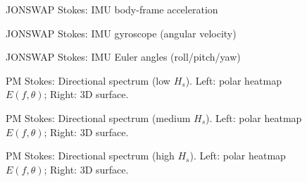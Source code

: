 \documentclass[11pt,letterpaper]{article}
\begin{document}
    \begin{figure}[H]\centering
    \resizebox{\textwidth}{!}{}
    \caption{JONSWAP Stokes: IMU body-frame acceleration}
    \label{fig:jonswap_imu_acc}
    \end{figure}

    \begin{figure}[H]\centering
    \resizebox{\textwidth}{!}{}
    \caption{JONSWAP Stokes: IMU gyroscope (angular velocity)}
    \label{fig:jonswap_imu_gyro}
    \end{figure}

    \begin{figure}[H]\centering
    \resizebox{\textwidth}{!}{}
    \caption{JONSWAP Stokes: IMU Euler angles (roll/pitch/yaw)}
    \label{fig:jonswap_euler}
    \end{figure}


    \begin{figure}[H]\centering
    \begin{minipage}{0.49\textwidth}
        \resizebox{\linewidth}{!}{}
    \end{minipage}\hfill
    \begin{minipage}{0.49\textwidth}
        \resizebox{\linewidth}{!}{}
    \end{minipage}
    \caption{PM Stokes: Directional spectrum (low $H_s$). Left: polar heatmap $E(f,\theta)$; Right: 3D surface.}
    \label{fig:pmstokes_spec_low}
    \end{figure}

    \begin{figure}[H]\centering
    \begin{minipage}{0.49\textwidth}
        \resizebox{\linewidth}{!}{}
    \end{minipage}\hfill
    \begin{minipage}{0.49\textwidth}
        \resizebox{\linewidth}{!}{}
    \end{minipage}
    \caption{PM Stokes: Directional spectrum (medium $H_s$). Left: polar heatmap $E(f,\theta)$; Right: 3D surface.}
    \label{fig:pmstokes_spec_medium}
    \end{figure}

    \begin{figure}[H]\centering
    \begin{minipage}{0.49\textwidth}
        \resizebox{\linewidth}{!}{}
    \end{minipage}\hfill
    \begin{minipage}{0.49\textwidth}
        \resizebox{\linewidth}{!}{}
    \end{minipage}
    \caption{PM Stokes: Directional spectrum (high $H_s$). Left: polar heatmap $E(f,\theta)$; Right: 3D surface.}
    \label{fig:pmstokes_spec_high}
    \end{figure}
\end{document}
